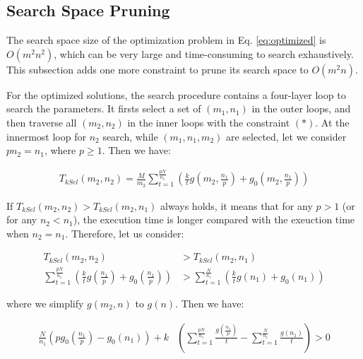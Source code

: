 \documentclass[12pt]{extbook}
\begin{document}
\subsection{Search Space Pruning}

The search space size of the optimization problem in Eq. \ref{eq:optimized} is $O(m^2n^2)$, which can be very large and time-consuming to search exhaustively. This subsection adds one more constraint to prune its search space to $O(m^2n)$.

For the optimized solutions, the search procedure contains a four-layer loop to search the parameters. It firsts select a set of $(m_{1}, n_{1})$ in the outer loops, and then traverse all $(m_{2}, n_{2})$ in the inner loops with the constraint $(*)$. At the innermost loop for $n_{2}$ search, while $(m_{1}, n_{1}, m_{2})$ are selected, let we consider $pn_{2} = n_{1}$, where $p \ge 1$. Then we have:

\begin{equation}
    \begin{aligned}
        T_{kSel}(m_{2}, n_{2}) = 
            \frac{M}{m_{2}} \sum_{t=1}^{\frac{pN}{n_{1}}}(\frac{k}{t}g(m_{2}, \frac{n_{1}}{p}) + g_{0}(m_{2}, \frac{n_{1}}{p}))
    \end{aligned}
\end{equation}

If $T_{kSel}(m_{2}, n_{2}) > T_{kSel}(m_{2}, n_{1})$ always holds, it means that for any $p > 1$ (or for any $n_{2} < n_{1}$), the execution time is longer compared with the exeuction time when $n_{2} = n_{1}$. Therefore, let us consider:


\begin{equation}
    \begin{aligned}
        T_{kSel}(m_{2}, n_{2}) &> T_{kSel}(m_{2}, n_{1}) \\
        \sum_{t=1}^{\frac{pN}{n_{1}}}(\frac{k}{t}g(\frac{n_{1}}{p}) + g_{0}(\frac{n_{1}}{p})) &> \sum_{t=1}^{\frac{N}{n_{1}}}(\frac{k}{t}g(n_{1}) + g_{0}(n_{1}))
    \end{aligned}
\end{equation}

where we simplify $g(m_{2}, n)$ to $g(n)$. Then we have:


\begin{equation}
    \label{eq:ineq}
    \begin{aligned}
        \frac{N}{n_{1}}(pg_{0}(\frac{n_{1}}{p}) - g_{0}(n_{1})) + k &(\sum_{t=1}^{\frac{pN}{n_{1}}}\frac{g(\frac{n_{1}}{p})}{t} - \sum_{t=1}^{\frac{N}{n_{1}}}\frac{g(n_{1})}{t}) > 0
    \end{aligned}
\end{equation}
\end{document}
